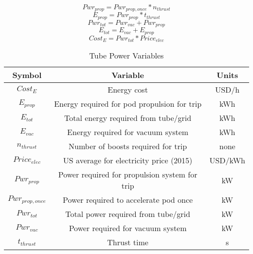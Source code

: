 \begin{equation}
	Pwr_{prop} = Pwr_{prop,once} * n_{thrust}
\end{equation}
\begin{equation}
	E_{prop} = Pwr_{prop} * t_{thrust}
\end{equation}
\begin{equation}
	Pwr_{tot} = Pwr_{vac} + Pwr_{prop}
\end{equation}
\begin{equation}
	E_{tot} = E_{vac} + E_{prop}
\end{equation}
\begin{equation}
	Cost_{E} = Pwr_{tot} * Price_{elec}
\end{equation}
\begin{table}[ht]
	\caption{Tube Power Variables} %
	\centering %
	\begin{tabular}{c c c} %
		\hline\hline %
		Symbol             & Variable                                      & Units   \\ [0.5ex] %
		\hline %
		$Cost_{E}$         & Energy cost                                   & USD/h   \\
		$E_{prop}$         & Energy required for pod propulsion for trip   & kWh     \\
		$E_{tot}$          & Total energy required from tube/grid          & kWh     \\
		$E_{vac}$          & Energy required for vacuum system             & kWh     \\
		$n_{thrust}$       & Number of boosts required for trip            & none    \\
		$Price_{elec}$     & US average for electricity price (2015)       & USD/kWh \\
		$Pwr_{prop}$       & Power required for propulsion system for trip & kW      \\
		$ Pwr_{prop,once}$ & Power required to accelerate pod once         & kW      \\
		$Pwr_{tot}$        & Total power required from tube/grid           & kW      \\
		$Pwr_{vac}$        & Power required for vacuum system              & kW      \\
		$t_{thrust}$       & Thrust time                                   & s       \\
		\hline %
	\end{tabular}
	\label{tbl:tube_power_vars} %
\end{table}
